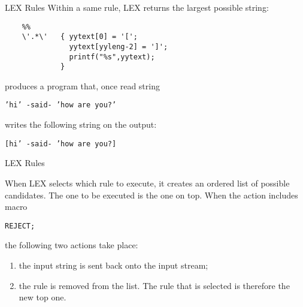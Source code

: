\begin{frame}[fragile]{LEX Rules}
Within a same rule, LEX returns the largest possible string:


\vspace{20pt}

\begin{verbatim}
    %%
    \'.*\'   { yytext[0] = '[';
               yytext[yyleng-2] = ']';
               printf("%s",yytext);
             }
\end{verbatim}


\vspace{20pt}

produces a program that, once read string


\vspace{20pt}

{\tt 'hi' -said- 'how are you?'}

\vspace{20pt}


writes the following string on the output:


\vspace{20pt}

{\tt [hi' -said- 'how are you?]} 


\end{frame}
\begin{frame}[fragile]{LEX Rules}

When LEX selects which rule to execute, it
creates an ordered list of possible candidates. The one
to be executed is the one on top. When the action includes macro
\begin{center}\tt REJECT;\end{center}
the following two actions take place:
\begin{enumerate}
\item the input string is sent back onto the input stream;
\item the rule is removed from the list. The rule that is selected
is therefore the new top one.
\end{enumerate}


\end{frame}
